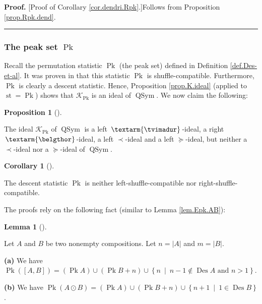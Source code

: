 \documentclass[numbers=enddot,12pt,final,onecolumn,notitlepage]{scrartcl}%
\theoremstyle{definition}
\newtheorem{lem}[theo]{Lemma}
\newenvironment{lemma}[1][]
{\begin{lem}[#1]\begin{leftbar}}
{\end{leftbar}\end{lem}}
\newtheorem{prop}[theo]{Proposition}
\newenvironment{proposition}[1][]
{\begin{prop}[#1]\begin{leftbar}}
{\end{leftbar}\end{prop}}
\newtheorem{coro}[theo]{Corollary}
\newenvironment{corollary}[1][]
{\begin{coro}[#1]\begin{leftbar}}
{\end{leftbar}\end{coro}}
\newenvironment{proof}[1][Proof]{\noindent\textbf{#1.} }{\ \rule{0.5em}{0.5em}}
\newcommand{\tvi}{\left. \textarm{\tvimadur} \right.}
\newcommand{\bel}{\left. \textarm{\belgthor} \right.}
\begin{document}
\begin{proof}
[Proof of Corollary \ref{cor.dendri.Rpk}.]Follows from Proposition
\ref{prop.Rpk.dend}.
\end{proof}

\subsubsection{The peak set $\operatorname*{Pk}$}

Recall the permutation statistic $\operatorname*{Pk}$ (the peak set) defined
in Definition \ref{def.Des-et-al}. It was proven in \cite[Theorem 4.7
\textbf{(a)}]{part1} that this statistic $\operatorname*{Pk}$ is
shuffle-compatible. Furthermore, $\operatorname*{Pk}$ is clearly a descent
statistic. Hence, Proposition \ref{prop.K.ideal} (applied to
$\operatorname*{st}=\operatorname*{Pk}$) shows that $\mathcal{K}%
_{\operatorname*{Pk}}$ is an ideal of $\operatorname*{QSym}$. We now claim the following:

\begin{proposition}
\label{prop.Pk.dend}The ideal $\mathcal{K}_{\operatorname*{Pk}}$ of
$\operatorname*{QSym}$ is a left $\tvi$-ideal, a right $\bel$-ideal, a left
$\left.  \prec\right.  $-ideal and a left $\left.  \succeq\right.  $-ideal,
but neither a $\left.  \prec\right.  $-ideal nor a $\left.  \succeq\right.
$-ideal of $\operatorname*{QSym}$.
\end{proposition}

\begin{corollary}
\label{cor.dendri.Pk}The descent statistic $\operatorname*{Pk}$ is neither
left-shuffle-compatible nor right-shuffle-compatible.
\end{corollary}

The proofs rely on the following fact (similar to Lemma \ref{lem.Epk.AB}):

\begin{lemma}
\label{lem.Pk.AB}Let $A$ and $B$ be two nonempty compositions. Let
$n=\left\vert A\right\vert $ and $m=\left\vert B\right\vert $.

\textbf{(a)} We have $\operatorname*{Pk}\left(  \left[  A,B\right]  \right)
=\left(  \operatorname*{Pk}A\right)  \cup\left(  \operatorname*{Pk}B+n\right)
\cup\left\{  n\ \mid\ n-1\notin\operatorname*{Des}A\text{ and }n>1\right\}  $.

\textbf{(b)} We have $\operatorname*{Pk}\left(  A\odot B\right)  =\left(
\operatorname*{Pk}A\right)  \cup\left(  \operatorname*{Pk}B+n\right)
\cup\left\{  n+1\ \mid\ 1\in\operatorname*{Des}B\right\}  $.
\end{lemma}
\end{document}
